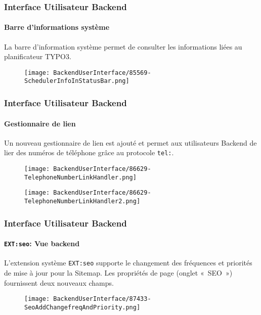 
\begin{frame}[fragile]
	\frametitle{Interface Utilisateur Backend}
	\framesubtitle{Barre d'informations système}

	La barre d'information système permet de consulter les informations liées au planificateur TYPO3.

	\begin{figure}
		\texttt{[image: BackendUserInterface/85569-SchedulerInfoInStatusBar.png]}
	\end{figure}

\end{frame}


\begin{frame}[fragile]
	\frametitle{Interface Utilisateur Backend}
	\framesubtitle{Gestionnaire de lien}

	Un nouveau gestionnaire de lien est ajouté et permet aux utilisateurs Backend de lier des numéros de
	téléphone grâce au protocole \texttt{tel:}.

	\begin{figure}
		\texttt{[image: BackendUserInterface/86629-TelephoneNumberLinkHandler.png]}
	\end{figure}

	\begin{figure}
		\texttt{[image: BackendUserInterface/86629-TelephoneNumberLinkHandler2.png]}
	\end{figure}

\end{frame}


\begin{frame}[fragile]
	\frametitle{Interface Utilisateur Backend}
	\framesubtitle{\texttt{EXT:seo}: Vue backend}

	L'extension système \texttt{EXT:seo} supporte le changement des fréquences et priorités de mise à jour pour la Sitemap.
	Les propriétés de page (onglet «~SEO~») fournissent deux nouveaux champs.

	\begin{figure}
		\texttt{[image: BackendUserInterface/87433-SeoAddChangefreqAndPriority.png]}
	\end{figure}

\end{frame}

